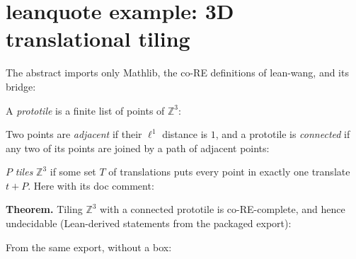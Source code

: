 \documentclass{article}
\begin{document}
\section*{leanquote example: 3D translational tiling}

The abstract imports only Mathlib, the co-RE definitions of lean-wang, and its bridge:
\leanquote[imports]{}

A \emph{prototile} is a finite list of points of $\mathbb{Z}^3$:

Two points are \emph{adjacent} if their $\ell^1$ distance is $1$, and a prototile is
\emph{connected} if any two of its points are joined by a path of adjacent points:

$P$ \emph{tiles} $\mathbb{Z}^3$ if some set $T$ of translations puts every point in exactly
one translate $t + P$. Here with its doc comment:

\textbf{Theorem.} Tiling $\mathbb{Z}^3$ with a connected prototile is co-RE-complete,
and hence undecidable (Lean-derived statements from the packaged export):

From the same export, without a box:
\end{document}
